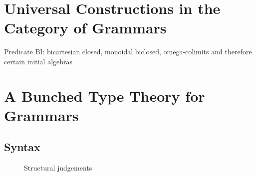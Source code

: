 \documentclass[sigconf,anonymous,review,screen]{acmart}
\newcommand{\ctxwff}[1]{#1 \,\, \mathsf{ok}}
\newcommand{\ctxwffjdg}[2]{#1 \vdash #2 \,\, \mathsf{type}}
\newcommand{\linctxwff}[2]{#1 \vdash #2 \,\, \mathsf{ok}}
\newcommand{\linctxwffjdg}[2]{#1 \vdash #2 \,\, \mathsf{linear}}
\begin{document}
\section{Universal Constructions in the Category of Grammars}

Predicate BI: bicartesian closed, monoidal biclosed, omega-colimits
and therefore certain initial algebras



\section{A Bunched Type Theory for Grammars}

\subsection{Syntax}

\begin{figure}
  \label{fig:structjdg}
  \caption{Structural judgements}
\end{figure}
\end{document}
